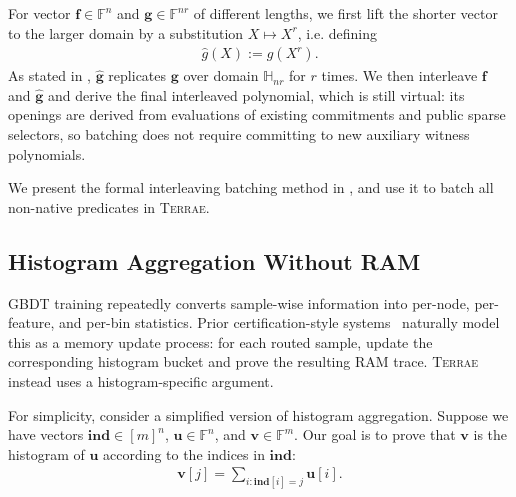For vector $\mathbf{f}\in \mathbb{F}^n$ and $\mathbf{g}\in \mathbb{F}^{nr}$ of different lengths, we first lift the shorter vector to the larger domain by a
substitution $X\mapsto X^r$, i.e. defining
\begin{align}
    \widehat{g}(X):=g(X^r).
\end{align}
As stated in , $\widehat{\mathbf{g}}$ replicates $\mathbf{g}$ over domain $\mathbb{H}_{nr}$ for $r$ times. 
We then interleave $\mathbf{f}$ and $\widehat{\mathbf{g}}$ 
and derive the final interleaved polynomial,
which is still virtual: 
its openings are derived from
evaluations of existing commitments and public sparse selectors, so batching
does not require committing to new auxiliary witness polynomials.

We present the formal interleaving batching method
in , and use it to batch all non-native predicates in \textsc{Terrae}.

\subsection{Histogram Aggregation Without RAM}\label{subsec:overview-histogram}

GBDT training repeatedly converts sample-wise information into per-node,
per-feature, and per-bin statistics. Prior certification-style systems~\cite{sparrow24,zkboost26}
naturally model this as a memory update process: for each routed sample, update
the corresponding histogram bucket and prove the resulting RAM trace.
\textsc{Terrae} instead uses a histogram-specific argument.

For simplicity, consider a simplified version of histogram aggregation.
Suppose we have vectors $\mathbf{ind}\in [m]^n$,
$\mathbf{u}\in \mathbb{F}^n$, and $\mathbf{v}\in \mathbb{F}^m$.
Our goal is to prove that $\mathbf{v}$ is the histogram
of $\mathbf{u}$ according to the indices in $\mathbf{ind}$:
\begin{align}
    \mathbf{v}[j]=\sum_{i:\mathbf{ind}[i]=j}\mathbf{u}[i].
\end{align}

